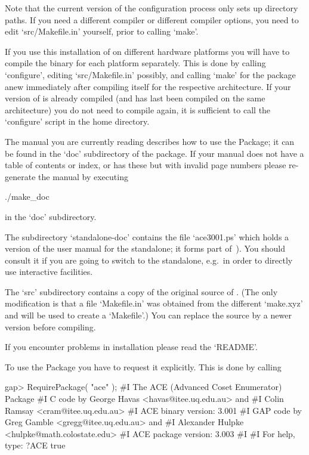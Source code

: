 Note that the  current version of the configuration  process only sets
up  directory paths.  If you  need a  different compiler  or different
compiler options, you need to edit `src/Makefile.in'  yourself,  prior
to calling `make'.

If you use this installation of {\GAP} on different hardware platforms
you will have to compile the binary for each platform separately. This
is done by calling `configure',  editing  `src/Makefile.in'  possibly,
and calling `make' for the package anew  immediately  after  compiling
{\GAP} itself for the respective  architecture.  If  your  version  of
{\GAP} is already compiled (and has last been  compiled  on  the  same
architecture)  you  do  not  need  to  compile  {\GAP}  again,  it  is
sufficient  to  call  the  `configure'  script  in  the  {\GAP}   home
directory.

The manual you are currently reading describes how to use  the  {\ACE}
Package; it can be found in the `doc' subdirectory of the package.  If
your manual does not have a table of contents or index, or  has  these
but with  invalid  page  numbers  please  re-generate  the  manual  by
executing

\begintt
./make_doc
\endtt

in the `doc' subdirectory.

The subdirectory `standalone-doc' contains the file `ace3001.ps' which
holds a version of the user manual for the {\ACE} standalone; it forms
part of~\cite{Ram99}). You should consult  it  if  you  are  going  to
switch to  the  {\ACE}  standalone,  e.g.~in  order  to  directly  use
interactive facilities.

The  `src' subdirectory  contains a  copy  of the  original source  of
{\ACE}.  (The  only modification  is  that  a  file `Makefile.in'  was
obtained from  the different `make.xyz' and  will be used  to create a
`Makefile'.)  You  can replace  the source by  a newer  version before
compiling.

If you encounter problems in installation please read the `README'.


To use the {\ACE} Package you have to request it explicitly.  This  is
done by calling

\beginexample
gap> RequirePackage( "ace" );
#I      The ACE (Advanced Coset Enumerator) Package
#I    C code by George Havas <havas@itee.uq.edu.au> and
#I              Colin Ramsay <cram@itee.uq.edu.au>
#I                   ACE binary version: 3.001
#I    GAP code by Greg Gamble <gregg@itee.uq.edu.au> and
#I           Alexander Hulpke <hulpke@math.colostate.edu>
#I                   ACE package version: 3.003
#I  
#I                   For help, type: ?ACE
true
\endexample

